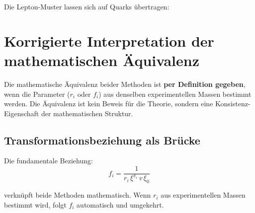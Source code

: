 	Die Lepton-Muster lassen sich auf Quarks übertragen:
	
	\begin{table}[H]
		\centering
		\caption{Quark-Vorhersagen aus etablierten Mustern}
		\label{tab:quark_vorhersagen}
	\end{table}
	
	\section{Korrigierte Interpretation der mathematischen Äquivalenz}
	\label{sec:korrigierte_interpretation}
	
	\begin{keypoint}
		Die mathematische Äquivalenz beider Methoden ist \textbf{per Definition gegeben}, wenn die Parameter ($r_i$ oder $f_i$) aus denselben experimentellen Massen bestimmt werden. Die Äquivalenz ist kein Beweis für die Theorie, sondern eine Konsistenz-Eigenschaft der mathematischen Struktur.
	\end{keypoint}
	
	\subsection{Transformationsbeziehung als Brücke}
	\label{subsec:transformationsbeziehung}
	
	Die fundamentale Beziehung:
	\begin{equation}
		f_i = \frac{1}{r_i \, \xi^{\pi_i} \, v \, \xi_0}
		\label{eq:transformation_bridge}
	\end{equation}
	
	verknüpft beide Methoden mathematisch. Wenn $r_i$ aus experimentellen Massen bestimmt wird, folgt $f_i$ automatisch und umgekehrt.
	
